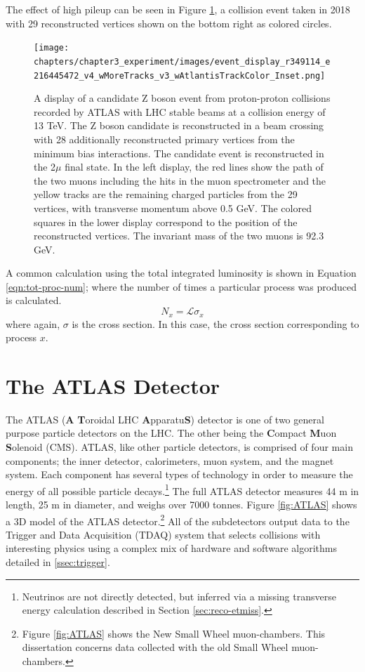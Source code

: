 		The effect of high pileup can be seen in Figure \ref{fig:high-pileup-event-display}, a collision event taken in 2018 with 29 reconstructed vertices shown on the bottom right as colored circles.
		\begin{figure}[!ht]
		\centering
		\texttt{[image: chapters/chapter3\_experiment/images/event\_display\_r349114\_e216445472\_v4\_wMoreTracks\_v3\_wAtlantisTrackColor\_Inset.png]}
		\caption{ A display of a candidate Z boson event from proton-proton collisions recorded by ATLAS with LHC stable beams at a collision energy of 13 TeV. The Z boson candidate is reconstructed in a beam crossing with 28 additionally reconstructed primary vertices from the minimum bias interactions. The candidate event is reconstructed in the 2$\mu$ final state. In the left display, the red lines show the path of the two muons including the hits in the muon spectrometer and the yellow tracks are the remaining charged particles from the 29 vertices, with transverse momentum above 0.5 GeV. The colored squares in the lower display correspond to the position of the reconstructed vertices. The invariant mass of the two muons is 92.3 GeV. }
		\label{fig:high-pileup-event-display}
		\end{figure}


		A common calculation using the total integrated luminosity is shown in Equation \ref{eqn:tot-proc-num}; where the number of times a particular process was produced is calculated.
		\begin{equation}\label{eqn:tot-proc-num}
		N_{x} = \mathcal{L} \sigma_{x}
		\end{equation}
		where again, $\sigma$ is the cross section. In this case, the cross section corresponding to process $x$.


\section{The ATLAS Detector}\label{sec:ATLAS}
	The ATLAS (\textbf{A} \textbf{T}oroidal LHC \textbf{A}pparatu\textbf{S}) detector is one of two general purpose particle detectors on the LHC. The other being the \textbf{C}ompact \textbf{M}uon \textbf{S}olenoid (CMS). ATLAS, like other particle detectors, is comprised of four main components; the inner detector, calorimeters, muon system, and the magnet system. Each component has several types of technology in order to measure the energy of all possible particle decays.\footnote{Neutrinos are not directly detected, but inferred via a missing transverse energy calculation described in Section \ref{sec:reco-etmiss}.} The full ATLAS detector measures 44 m in length, 25 m in diameter, and weighs over 7000 tonnes. Figure \ref{fig:ATLAS} shows a 3D model of the ATLAS detector.\footnote{Figure \ref{fig:ATLAS} shows the New Small Wheel muon-chambers. This dissertation concerns data collected with the old Small Wheel muon-chambers.} All of the subdetectors output data to the Trigger and Data Acquisition (TDAQ) system that selects collisions with interesting physics using a complex mix of hardware and software algorithms detailed in \ref{ssec:trigger}. 

